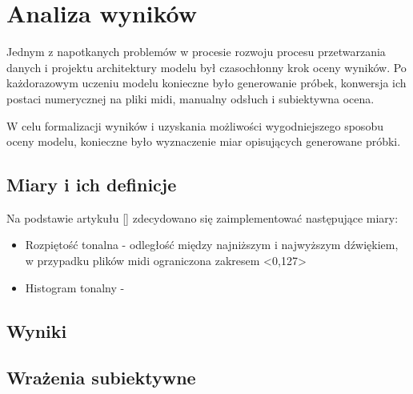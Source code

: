 \chapter{Analiza wyników}
{

    Jednym z napotkanych problemów w procesie rozwoju procesu przetwarzania danych i projektu architektury modelu
    był czasochłonny krok oceny wyników. Po każdorazowym uczeniu modelu konieczne było generowanie próbek, 
    konwersja ich postaci numerycznej na pliki midi, manualny odsłuch i subiektywna ocena.

    W celu formalizacji wyników i uzyskania możliwości wygodniejszego sposobu oceny modelu, konieczne było wyznaczenie
    miar opisujących generowane próbki. 

    \section{Miary i ich definicje}
    {
        Na podstawie artykułu [] zdecydowano się zaimplementować następujące miary:
        \begin{itemize}
            \item Rozpiętość tonalna - odległość między najniższym i najwyższym dźwiękiem, w przypadku plików midi ograniczona
            zakresem <0,127>
            \item Histogram tonalny - 
        \end{itemize}
    }

    \section{Wyniki}
    {

    }

    \section{Wrażenia subiektywne}
    {
        
    }
}